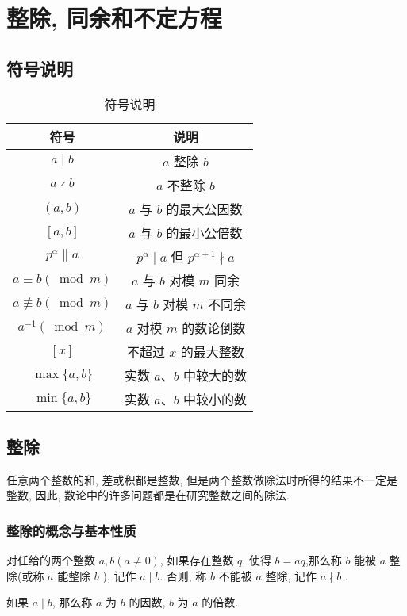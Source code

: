 \chapter{整除, 同余和不定方程}

\section*{符号说明}
\begin{table}[ht]
	\centering
	\begin{tabular}{cc}
		\hline
		符号                      & 说明                                          \\  \hline
		$a \mid b$                & $a$ 整除 $b$                                  \\
		$a \nmid b$               & $a$ 不整除 $b$                                \\
		$(a, b)$                  & $a$ 与 $b$ 的最大公因数                       \\
		$[a, b]$                  & $a$ 与 $b$ 的最小公倍数                       \\
		$p^{\alpha} \| a$         & $p^{\alpha} \mid a$ 但 $p^{\alpha+1} \nmid a$ \\
		$a \equiv b(\bmod m)$     & $a$ 与 $b$ 对模 $m$ 同余                      \\
		$a \not\equiv b(\bmod m)$ & $a$ 与 $b$ 对模 $m$ 不同余                    \\
		$a^{-1}(\bmod m)$         & $a$ 对模 $m$ 的数论倒数                       \\
		$[x]$                     & 不超过 $x$ 的最大整数                         \\
		$\max \{a, b\}$           & 实数 $a 、 b$ 中较大的数                      \\
		$\min \{a, b\}$           & 实数 $a 、 b$ 中较小的数                      \\ \hline
	\end{tabular}
	\caption{符号说明}
\end{table}

\section{整除}
任意两个整数的和, 差或积都是整数, 但是两个整数做除法时所得的结果不一定是整数, 因此, 数论中的许多问题都是在研究整数之间的除法.

\subsection{整除的概念与基本性质}
\begin{definition}
	对任给的两个整数 $a ,  b(a \neq 0)$, 如果存在整数 $q$, 使得 $b=a q$,那么称 $b$ 能被 $a$ 整除(或称 $a$ 能整除 $b$ ), 记作 $a \mid b$. 否则, 称 $b$ 不能被 $a$ 整除, 记作 $a \nmid b$ .

	如果 $a \mid b$, 那么称 $a$ 为 $b$ 的因数, $b$ 为 $a$ 的倍数.
\end{definition}

